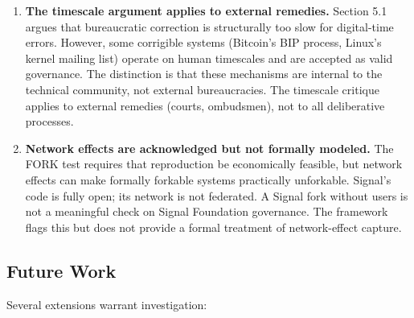 \begin{enumerate}
    \item \textbf{The timescale argument applies to external remedies.} Section 5.1 argues that bureaucratic correction is structurally too slow for digital-time errors. However, some corrigible systems (Bitcoin's BIP process, Linux's kernel mailing list) operate on human timescales and are accepted as valid governance. The distinction is that these mechanisms are internal to the technical community, not external bureaucracies. The timescale critique applies to external remedies (courts, ombudsmen), not to all deliberative processes.

    \item \textbf{Network effects are acknowledged but not formally modeled.} The FORK test requires that reproduction be economically feasible, but network effects can make formally forkable systems practically unforkable. Signal's code is fully open; its network is not federated. A Signal fork without users is not a meaningful check on Signal Foundation governance. The framework flags this but does not provide a formal treatment of network-effect capture.
\end{enumerate}

\subsection{Future Work}

Several extensions warrant investigation:

